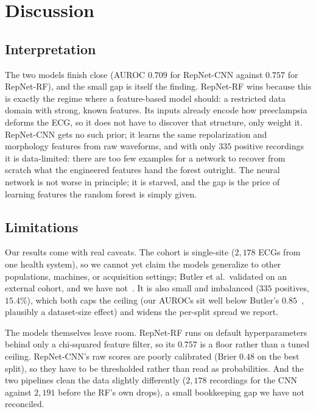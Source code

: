 \documentclass[sigconf,nonacm]{acmart}
\begin{document}
\section{Discussion}
\label{sec:discussion}

\subsection{Interpretation}

The two models finish close (AUROC $0.709$ for RepNet-CNN against $0.757$
for RepNet-RF), and the small gap is itself the finding. RepNet-RF wins
because this is exactly the regime where a feature-based model should: a
restricted data domain with strong, known features. Its inputs already encode
how preeclampsia deforms the ECG, so it does not have to discover that
structure, only weight it. RepNet-CNN gets no such prior; it learns the same
repolarization and morphology features from raw waveforms, and with only $335$
positive recordings it is data-limited: there are too few examples for a
network to recover from scratch what the engineered features hand the forest
outright. The neural network is not worse in principle; it is starved, and the
gap is the price of learning features the random forest is simply given.

\subsection{Limitations}

Our results come with real caveats. The cohort is single-site ($2{,}178$
ECGs from one health system), so we cannot yet claim the models generalize to
other populations, machines, or acquisition settings; Butler et al.\ validated
on an external cohort, and we have not~\cite{butler_ai-based_2024}. It is also
small and imbalanced ($335$ positives, $15.4\%$), which both caps the ceiling
(our AUROCs sit well below Butler's $0.85$~\cite{butler_ai-based_2024}, plausibly a dataset-size effect)
and widens the per-split spread we report.

The models themselves leave room. RepNet-RF runs on default hyperparameters
behind only a chi-squared feature filter, so its $0.757$ is a floor rather than
a tuned ceiling. RepNet-CNN's raw scores are poorly calibrated (Brier $0.48$ on
the best split), so they have to be thresholded rather than read as
probabilities. And the two pipelines clean the data slightly differently
($2{,}178$ recordings for the CNN against $2{,}191$ before the RF's own drops),
a small bookkeeping gap we have not reconciled.
\end{document}
